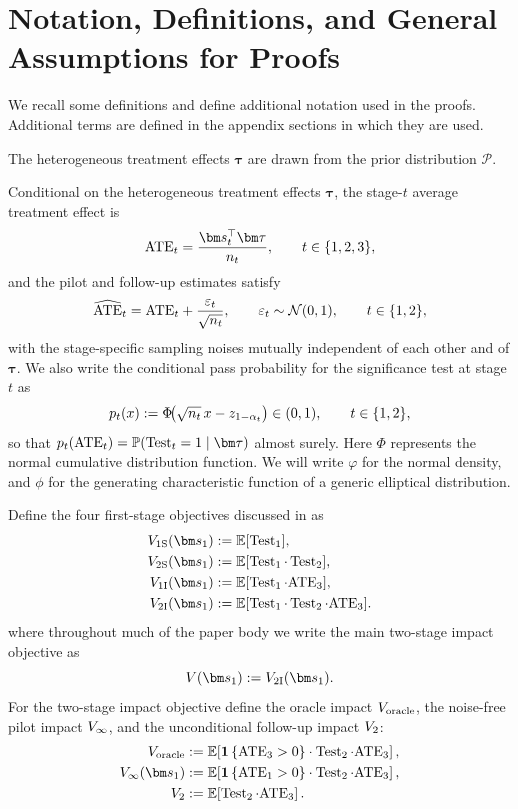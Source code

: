 \section{Notation, Definitions, and General Assumptions for Proofs}
\label{app:notation-for-proofs}

We recall some definitions and define additional notation used in the proofs.
Additional terms are defined in the appendix sections in which they are used.

The heterogeneous treatment effects $\bm\tau$ are drawn from the prior distribution $\mathcal{P}$.

Conditional on the heterogeneous treatment effects $\bm\tau$, the stage-$t$ average treatment effect is
\[
  \ATE_t = \frac{\bm s_t^\top \bm\tau}{n_t},
  \qquad t\in\{1,2,3\},
\]
and the pilot and follow-up estimates satisfy
\[
  \widehat{\mathrm{ATE}}_t = \mathrm{ATE}_t+\frac{\varepsilon_t}{\sqrt{n_t}},
  \qquad
  \varepsilon_t\sim\mathcal N(0,1),
  \qquad
  t\in\{1,2\},
\]
with the stage-specific sampling noises mutually independent of each other and of $\bm\tau$.
We also write the conditional pass probability for the significance test at stage $t$ as
\[
  p_t(x):= \Phi\!\big(\sqrt{n_t}\,x-z_{1-\alpha_t}\big)\in(0,1),
  \qquad t\in\{1,2\},
\]
so that $p_t(\ATE_t)=\P(\Test_t=1\mid \bm\tau)$ almost surely. Here $\Phi$ represents the normal cumulative distribution function. We will write $\varphi$ for the normal density, and $\phi$ for the generating characteristic function of a generic elliptical distribution.

Define the four first-stage objectives discussed in  as
\begin{align*}
  V_{\singlesuccess}(\bm s_1) &\defeq \E[\Test_1],\\
  V_{\twosuccess}(\bm s_1) &\defeq \E[\Test_1\cdot\Test_2],\\
  V_{\singleimpact}(\bm s_1) &\defeq \E[\Test_1\cdot \ATE_3],\\
  V_{\twoimpact}(\bm s_1) &\defeq \E[\Test_1\cdot\Test_2\cdot \ATE_3].
\end{align*}
where throughout much of the paper body we write the main two-stage impact objective as
\[
  V(\bm s_1)\defeq V_{\twoimpact}(\bm s_1).
\]
For the two-stage impact objective define the oracle impact $V_{\mathrm{oracle}}$, the noise-free pilot impact $V_{\infty}$, and the unconditional follow-up impact $V_{2}$:
\begin{align*}
  V_{\oracle}
  &\defeq \E\!\left[\indic{\ATE_3>0}\cdot\Test_2\cdot \ATE_3\right],\\
  V_{\noisefree}(\bm s_1)
  &\defeq \E\!\left[\indic{\ATE_1>0}\cdot\Test_2\cdot \ATE_3\right],\\
  V_{\followup}
  &\defeq \E\!\left[\Test_2\cdot \ATE_3\right].
\end{align*}

